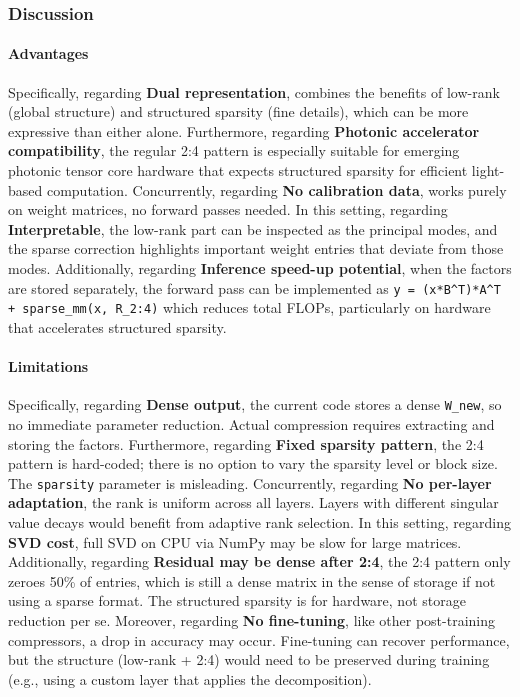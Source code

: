 \subsubsection*{Discussion}

\paragraph{Advantages}

Specifically, regarding \textbf{Dual representation}, combines the benefits of low-rank (global structure) and structured sparsity (fine details), which can be more expressive than either alone. Furthermore, regarding \textbf{Photonic accelerator compatibility}, the regular 2:4 pattern is especially suitable for emerging photonic tensor core hardware that expects structured sparsity for efficient light-based computation. Concurrently, regarding \textbf{No calibration data}, works purely on weight matrices, no forward passes needed. In this setting, regarding \textbf{Interpretable}, the low-rank part can be inspected as the principal modes, and the sparse correction highlights important weight entries that deviate from those modes. Additionally, regarding \textbf{Inference speed-up potential}, when the factors are stored separately, the forward pass can be implemented as \texttt{y = (x*B\textasciicircum{}T)*A\textasciicircum{}T + sparse\_mm(x, R\_2:4)} which reduces total FLOPs, particularly on hardware that accelerates structured sparsity.


\paragraph{Limitations}

Specifically, regarding \textbf{Dense output}, the current code stores a dense \texttt{W\_new}, so no immediate parameter reduction. Actual compression requires extracting and storing the factors. Furthermore, regarding \textbf{Fixed sparsity pattern}, the 2:4 pattern is hard-coded; there is no option to vary the sparsity level or block size. The \texttt{sparsity} parameter is misleading. Concurrently, regarding \textbf{No per-layer adaptation}, the rank is uniform across all layers. Layers with different singular value decays would benefit from adaptive rank selection. In this setting, regarding \textbf{SVD cost}, full SVD on CPU via NumPy may be slow for large matrices. Additionally, regarding \textbf{Residual may be dense after 2:4}, the 2:4 pattern only zeroes 50\% of entries, which is still a dense matrix in the sense of storage if not using a sparse format. The structured sparsity is for hardware, not storage reduction per se. Moreover, regarding \textbf{No fine-tuning}, like other post-training compressors, a drop in accuracy may occur. Fine-tuning can recover performance, but the structure (low-rank + 2:4) would need to be preserved during training (e.g., using a custom layer that applies the decomposition).


